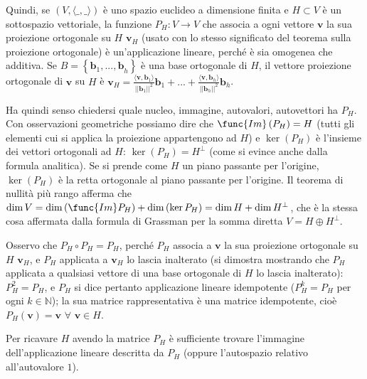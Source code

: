 \documentclass{article}
\begin{document}
Quindi, se $\left( V,\langle \_,\_\rangle \right) $ \`{e} uno spazio
euclideo a dimensione finita e $H\subset V$ \`{e} un sottospazio vettoriale,
la funzione $P_{H}:V\rightarrow V$ che associa a ogni vettore $\mathbf{v}$
la sua proiezione ortogonale su $H$ $\mathbf{v}_{H}$ (usato con lo stesso
significato del teorema sulla proiezione ortogonale) \`{e} un'applicazione
lineare, perch\'{e} \`{e} sia omogenea che additiva. Se $B=\left\{ \mathbf{b}%
_{1}\mathbf{,...,b}_{h}\right\} $ \`{e} una base ortogonale di $H$, il
vettore proiezione ortogonale di $\mathbf{v}$ su $H$ \`{e} $\mathbf{v}_{H}=%
\frac{\langle \mathbf{v},\mathbf{b}_{1}\rangle }{\left\vert \left\vert 
\mathbf{b}_{1}\right\vert \right\vert ^{2}}\mathbf{b}_{1}+...+\frac{\langle 
\mathbf{v},\mathbf{b}_{h}\rangle }{\left\vert \left\vert \mathbf{b}%
_{h}\right\vert \right\vert ^{2}}\mathbf{b}_{h}$.

Ha quindi senso chiedersi quale nucleo, immagine, autovalori, autovettori ha 
$P_{H}$. Con osservazioni geometriche possiamo dire che $\func{Im}\left(
P_{H}\right) =H$ (tutti gli elementi cui si applica la proiezione
appartengono ad $H$) e $\ker \left( P_{H}\right) $ \`{e} l'insieme dei
vettori ortogonali ad $H$: $\ker \left( P_{H}\right) =H^{\perp }$ (come si
evince anche dalla formula analitica). Se si prende come $H$ un piano
passante per l'origine, $\ker \left( P_{H}\right) $ \`{e} la retta
ortogonale al piano passante per l'origine. Il teorema di nullit\`{a} pi\`{u}
rango afferma che $\dim V=\dim \left( \func{Im}P_{H}\right) +\dim \left(
\ker P_{H}\right) =\dim H+\dim H^{\perp }$, che \`{e} la stessa cosa
affermata dalla formula di Grassman per la somma diretta $V=H\oplus H^{\perp
}$.

Osservo che $P_{H}\circ P_{H}=P_{H}$, perch\'{e} $P_{H}$ associa a $\mathbf{v%
}$ la sua proiezione ortogonale su $H$ $\mathbf{v}_{H}$, e $P_{H}$ applicata
a $\mathbf{v}_{H}$ lo lascia inalterato (si dimostra mostrando che $P_{H}$
applicata a qualsiasi vettore di una base ortogonale di $H$ lo lascia
inalterato): $P_{H}^{2}=P_{H}$, e $P_{H}$ si dice pertanto applicazione
lineare idempotente ($P_{H}^{k}=P_{H}$ per ogni $k\in 
\mathbb{N}
$); la sua matrice rappresentativa \`{e} una matrice idempotente, cio\`{e} $%
P_{H}\left( \mathbf{v}\right) =\mathbf{v}$ $\forall $ $\mathbf{v}\in H$.

Per ricavare $H$ avendo la matrice $P_{H}$ \`{e} sufficiente trovare
l'immagine dell'applicazione lineare descritta da $P_{H}$ (oppure
l'autospazio relativo all'autovalore $1$).
\end{document}
